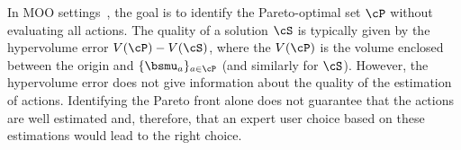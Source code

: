 In MOO settings~\cite{Zuluaga2013}, the goal is to identify the Pareto-optimal set $\cP$ without evaluating all actions. The quality of a solution $\cS$ is typically given by the hypervolume error $V(\cP) - V(\cS)$, where the $V(\cP)$ is the volume enclosed between the origin and $\{ \bsmu_a \}_{a \in \cP}$ (and similarly for $\cS$). However, the hypervolume error does not give information about the quality of the estimation of actions. Identifying the Pareto front alone does not guarantee that the actions are well estimated and, therefore, that an expert user choice based on these estimations would lead to the right choice.

